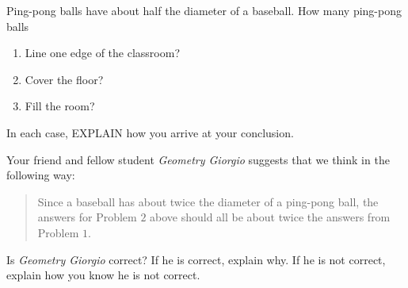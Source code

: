 \documentclass[handout,noauthor,nooutcomes,hints,12pt]{ximera}
\begin{document}
\begin{question}
Ping-pong balls have about half the diameter of a baseball. How
many ping-pong balls
\begin{enumerate}
\item Line one edge of the classroom?
\item Cover the floor?
\item Fill the room?
\end{enumerate}
In each case,  EXPLAIN how you arrive at your conclusion.
\end{question}
\mynewpage




\begin{question}
  Your friend and fellow student \textit{Geometry Giorgio} suggests
  that we think in the following way:
\begin{quote}
  Since a baseball has about twice the diameter of a ping-pong
  ball, the answers for Problem $2$ above should all be about twice the
  answers from Problem $1$.
\end{quote}
Is \textit{Geometry Giorgio} correct?  If he is correct, explain
why. If he is not correct, explain how you know he is not correct.
\end{question}
\end{document}
